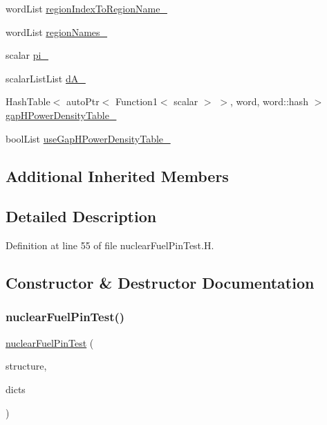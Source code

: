 \begin{DoxyCompactItemize}
\item 
word\+List \hyperlink{classFoam_1_1powerModels_1_1nuclearFuelPinTest_a639c2bc843a6948636eb5bf034616e53}{region\+Index\+To\+Region\+Name\+\_\+}
\item 
word\+List \hyperlink{classFoam_1_1powerModels_1_1nuclearFuelPinTest_aaee8da85bb053cffaafc054adea8673e}{region\+Names\+\_\+}
\item 
scalar \hyperlink{classFoam_1_1powerModels_1_1nuclearFuelPinTest_ad7683f85f3785b9444544d92fcfc3e1d}{pi\+\_\+}
\item 
scalar\+List\+List \hyperlink{classFoam_1_1powerModels_1_1nuclearFuelPinTest_a753fe594accfbeba343f55dfdf274a0f}{d\+A\+\_\+}
\item 
Hash\+Table$<$ auto\+Ptr$<$ Function1$<$ scalar $>$ $>$, word, word\+::hash $>$ \hyperlink{classFoam_1_1powerModels_1_1nuclearFuelPinTest_af3e43259f1e5ea73a5bb89f36d6cf584}{gap\+H\+Power\+Density\+Table\+\_\+}
\item 
bool\+List \hyperlink{classFoam_1_1powerModels_1_1nuclearFuelPinTest_a09a38dead56d361b78f3134ba95438a0}{use\+Gap\+H\+Power\+Density\+Table\+\_\+}
\end{DoxyCompactItemize}
\subsection*{Additional Inherited Members}


\subsection{Detailed Description}


Definition at line 55 of file nuclear\+Fuel\+Pin\+Test.\+H.



\subsection{Constructor \& Destructor Documentation}
\mbox{\label{classFoam_1_1powerModels_1_1nuclearFuelPinTest_a0fceab77e99080514ba347aa8a16fb11}} 
\subsubsection{\texorpdfstring{nuclear\+Fuel\+Pin\+Test()}{nuclearFuelPinTest()}}
{\footnotesize\ttfamily \hyperlink{classFoam_1_1powerModels_1_1nuclearFuelPinTest}{nuclear\+Fuel\+Pin\+Test} (\begin{DoxyParamCaption}\item[{\hyperlink{classFoam_1_1structure}{structure} \&}]{structure,  }\item[{const dictionary \&}]{dicts }\end{DoxyParamCaption})}



